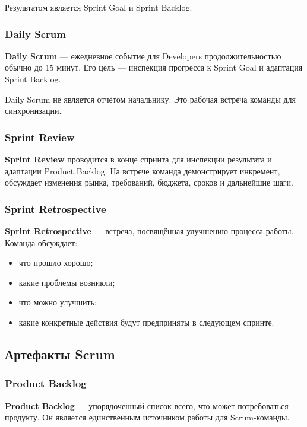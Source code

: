 \documentclass[12pt,a4paper]{article}
\begin{document}
Результатом является Sprint Goal и Sprint Backlog.

\subsubsection{Daily Scrum}

\textbf{Daily Scrum} --- ежедневное событие для Developers продолжительностью обычно до 15 минут. Его цель --- инспекция прогресса к Sprint Goal и адаптация Sprint Backlog.

Daily Scrum не является отчётом начальнику. Это рабочая встреча команды для синхронизации.

\subsubsection{Sprint Review}

\textbf{Sprint Review} проводится в конце спринта для инспекции результата и адаптации Product Backlog. На встрече команда демонстрирует инкремент, обсуждает изменения рынка, требований, бюджета, сроков и дальнейшие шаги.

\subsubsection{Sprint Retrospective}

\textbf{Sprint Retrospective} --- встреча, посвящённая улучшению процесса работы. Команда обсуждает:
\begin{itemize}
    \item что прошло хорошо;
    \item какие проблемы возникли;
    \item что можно улучшить;
    \item какие конкретные действия будут предприняты в следующем спринте.
\end{itemize}

\subsection{Артефакты Scrum}

\subsubsection{Product Backlog}

\textbf{Product Backlog} --- упорядоченный список всего, что может потребоваться продукту. Он является единственным источником работы для Scrum-команды.
\end{document}
